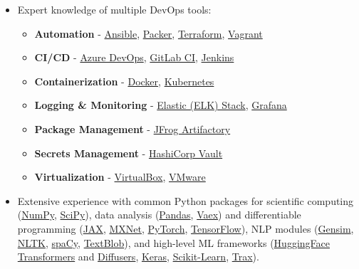 \documentclass[letterpaper,11pt]{article}
\begin{document}
\begin{itemize}[leftmargin=0.15in, label={}]
    \item Expert knowledge of multiple DevOps tools:
    
    \begin{itemize}
        \item \textbf{Automation} -
            \href{https://www.redhat.com/en/technologies/management/ansible}{Ansible},
            \href{https://www.packer.io/}{Packer}, \href{https://www.terraform.io/}{Terraform},
            \href{https://www.vagrantup.com/}{Vagrant}
        \item \textbf{CI/CD} - 
            \href{https://docs.microsoft.com/en-us/azure/devops}{Azure DevOps},
            \href{https://docs.gitlab.com/ee/ci/}{GitLab CI}, 
            \href{https://www.jenkins.io/}{Jenkins}
        \item \textbf{Containerization} - 
            \href{https://www.docker.com/}{Docker}, 
            \href{https://kubernetes.io/}{Kubernetes}
        \item \textbf{Logging \& Monitoring} - 
            \href{https://www.elastic.co/elastic-stack/}{Elastic (ELK) Stack},
            \href{https://grafana.com/grafana/}{Grafana}
        \item \textbf{Package Management} - 
            \href{https://jfrog.com/artifactory/}{JFrog Artifactory} 
        \item \textbf{Secrets Management} - 
            \href{https://www.hashicorp.com/products/vault/}{HashiCorp Vault}
        \item \textbf{Virtualization} - 
            \href{https://www.virtualbox.org/}{VirtualBox}, 
            \href{https://www.vmware.com/}{VMware}
    \end{itemize}
    
    \item Extensive experience with common Python packages for scientific computing (\href{https://numpy.org/}{NumPy}, \href{https://www.scipy.org/}{SciPy}), data analysis (\href{https://pandas.pydata.org/}{Pandas}, \href{https://github.com/vaexio/vaex}{Vaex}) and differentiable programming (\href{https://jax.readthedocs.io/en/latest/index.html}{JAX}, \href{https://mxnet.apache.org/versions/1.8.0/}{MXNet}, \href{https://pytorch.org/}{PyTorch}, \href{https://www.tensorflow.org/}{TensorFlow}), NLP modules (\href{https://radimrehurek.com/gensim/}{Gensim}, \href{https://www.nltk.org/}{NLTK}, \href{https://spacy.io/}{spaCy}, \href{https://textblob.readthedocs.io/en/dev/}{TextBlob}), and high-level ML frameworks (\href{https://github.com/huggingface/transformers}{HuggingFace Transformers} and \href{https://huggingface.co/docs/diffusers/index}{Diffusers}, \href{https://keras.io/}{Keras}, \href{https://scikit-learn.org/stable/}{Scikit-Learn}, \href{https://github.com/google/trax}{Trax}).
    

\end{itemize}
\end{document}
